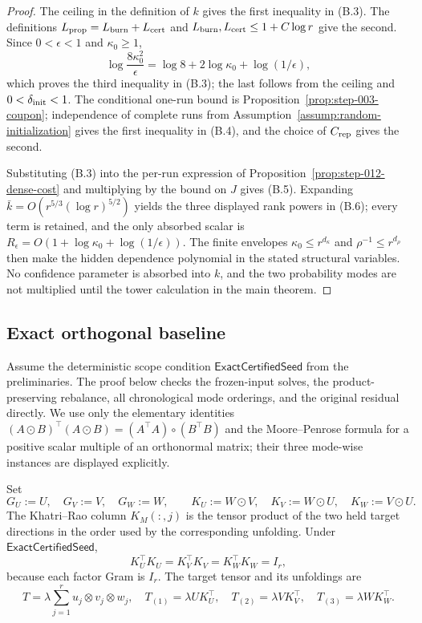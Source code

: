 \begin{proof}
The ceiling in the definition of $k$ gives the first inequality in (B.3).
The definitions $L_{\rm prop}=L_{\rm burn}+L_{\rm cert}$ and
$L_{\rm burn},L_{\rm cert}\le1+C\log r$ give the second.  Since
$0<\epsilon<1$ and $\kappa _0\ge1$,
\[
\log\frac{8\kappa _0^2}{\epsilon}
 =\log 8+2\log\kappa _0+\log(1/\epsilon),
\]
which proves the third inequality in (B.3); the last follows from the ceiling
and $0<\delta_{\rm init}<1$.  The conditional one-run bound is
Proposition~\ref{prop:step-003-coupon}; independence of complete runs from
Assumption~\ref{assump:random-initialization} gives the first inequality in
(B.4), and the choice of $C_{\rm rep}$ gives the second.

Substituting (B.3) into the per-run expression of
Proposition~\ref{prop:step-012-dense-cost} and multiplying by the bound on
$J$ gives (B.5).  Expanding
$\bar k=O(r^{5/3}(\log r)^{5/2})$ yields the three displayed rank powers in
(B.6); every term is retained, and the only absorbed scalar is
$R_\epsilon=O(1+\log\kappa _0+\log(1/\epsilon))$.  The finite envelopes
$\kappa _0\le r^{d_\kappa}$ and $\rho^{-1}\le r^{d_\rho}$ then make the
hidden dependence polynomial in the stated structural variables.  No
confidence parameter is absorbed into $k$, and the two probability modes are
not multiplied until the tower calculation in the main theorem.
\end{proof}

\subsection{Exact orthogonal baseline}\label{app:step-013}

Assume the deterministic scope condition $\mathsf{ExactCertifiedSeed}$ from
the preliminaries.  The proof below checks the frozen-input solves, the
product-preserving rebalance, all chronological mode orderings, and the
original residual directly.  We use only the elementary identities
$(A\odot B)^\top(A\odot B)=(A^\top A)\circ(B^\top B)$ and the
Moore--Penrose formula for a positive scalar multiple of an orthonormal
matrix; their three mode-wise instances are displayed explicitly.

Set
\[
G_U:=U,\quad G_V:=V,\quad G_W:=W,\qquad
K_U:=W\odot V,\quad K_V:=W\odot U,\quad K_W:=V\odot U.
\tag{1}
\]
The Khatri--Rao column \(K_M(:,j)\) is the tensor product of the two held
target directions in the order used by the corresponding unfolding. Under
\(\mathsf{ExactCertifiedSeed}\),
\[
K_U^\top K_U=K_V^\top K_V=K_W^\top K_W=I_r,
\tag{2}
\]
because each factor Gram is \(I_r\). The target tensor and its unfoldings are
\[
T=\lambda\sum_{j=1}^r u_j\otimes v_j\otimes w_j,\quad
T_{(1)}=\lambda U K_U^\top,\quad
T_{(2)}=\lambda V K_V^\top,\quad
T_{(3)}=\lambda W K_W^\top.
\tag{3}
\]


